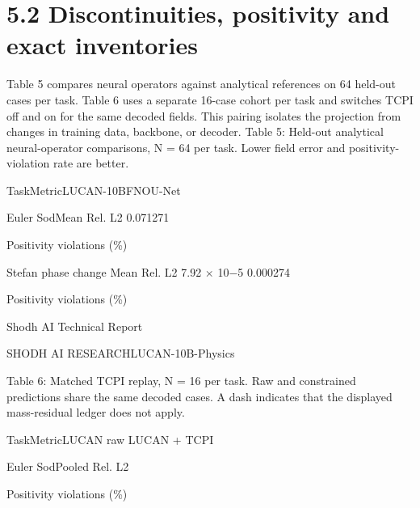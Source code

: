 \documentclass[11pt]{article}
\begin{document}
\section*{5.2 Discontinuities, positivity and exact inventories}

Table 5 compares neural operators against analytical references on 64 held-out cases per
task. Table 6 uses a separate 16-case cohort per task and switches TCPI off and on for
the same decoded fields. This pairing isolates the projection from changes in training data,
backbone, or decoder.
Table 5: Held-out analytical neural-operator comparisons, N = 64 per task. Lower field error and
positivity-violation rate are better.


\noindent Task\quad Metric\quad LUCAN-10B\quad FNO\quad U-Net\par


\noindent Euler Sod\quad Mean Rel. L2 0.071271\par


\noindent Positivity violations (\%)\par


\noindent Stefan phase change Mean Rel. L2 7.92 \ensuremath{\times} 10\ensuremath{-}5 0.000274\par


\noindent Positivity violations (\%)\par






\noindent Shodh AI Technical Report\par




\noindent SHODH AI RESEARCH\quad LUCAN-10B-Physics\par



Table 6: Matched TCPI replay, N = 16 per task. Raw and constrained predictions share the same
decoded cases. A dash indicates that the displayed mass-residual ledger does not apply.


\noindent Task\quad Metric\quad LUCAN raw LUCAN + TCPI\par


\noindent Euler Sod\quad Pooled Rel. L2\par


\noindent Positivity violations (\%)\par
\end{document}
